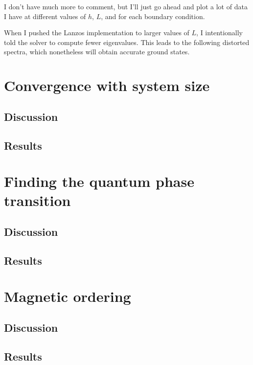 \documentclass{article}
\begin{document}
I don't have much more to comment, but I'll just go ahead and plot
a lot of data I have at different values of $h$, $L$, and for each boundary
condition.


When I pushed the Lanzos implementation to larger values of $L$, I intentionally
told the solver to compute fewer eigenvalues.
This leads to the following distorted spectra,
which nonetheless will obtain accurate ground states.

\newpage

\section{
Convergence with system size
}

\subsection{
Discussion
}

\subsection{
Results
}

\newpage

\section{
Finding the quantum phase transition
}


\subsection{
Discussion
}

\subsection{
Results
}


\newpage

\section{
Magnetic ordering
}


\subsection{
Discussion
}

\subsection{
Results
}
\end{document}
